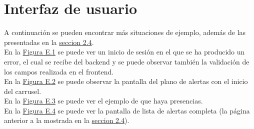 \chapter{Interfaz de usuario}
\label{anexo-e}

A continuación se pueden encontrar más situaciones de ejemplo, además de las presentadas en la \hyperref[section-ui]{seccion 2.4}.\\

En la \hyperref[fig:login-error]{Figura E.1} se puede ver un inicio de sesión en el que se ha producido un error, el cual se recibe del backend y se puede observar también la validación de los campos realizada en el frontend.\\

En la \hyperref[fig:map-carrusel]{Figura E.2} se puede observar la pantalla del plano de alertas con el inicio del carrusel.\\

En la \hyperref[fig:map-presencias]{Figura E.3} se puede ver el ejemplo de que haya presencias.\\

En la \hyperref[fig:list-completa]{Figura E.4} se puede ver la pantalla de lista de alertas completa (la página anterior a la mostrada en la \hyperref[section-ui]{seccion 2.4}).\\


